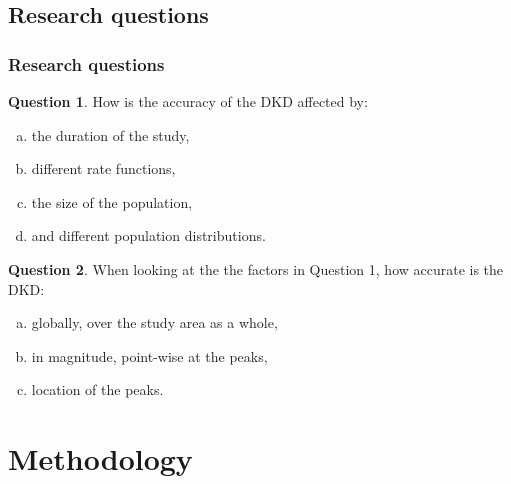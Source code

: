 \documentclass[notheorems]{beamer}
\theoremstyle{definition}
\newtheorem{researchquestion}{Question}
\theoremstyle{example}
\begin{document}
\subsection{Research questions}
\begin{frame}\frametitle{Research questions}
    \begin{researchquestion}{How is the accuracy of the DKD affected by:}
        \begin{enumerate}[a)]
            \item the duration of the study, \label{thm:accuracy-affected:duration}%
            \item different rate functions, \label{thm:accuracy-affected:rates}%
            \item the size of the population, \label{thm:accuracy-affected:popsize}%
            \item and different population distributions. \label{thm:accuracy-affected:popdist}%
        \end{enumerate}
    \end{researchquestion}
    \begin{researchquestion}{When looking at the the factors in Question 1,
    how accurate is the DKD:}
        \begin{enumerate}[a)]
            \item globally, over the study area as a whole, \label{thm:accuracy-scale:global}%
            \item in magnitude, point-wise at the peaks, \label{thm:accuracy-scale:peaks}%
            \item location of the peaks. \label{thm:accuracy-scale:peaks-location}%
        \end{enumerate}
    \end{researchquestion}
\end{frame}

\section{Methodology}

\end{document}
